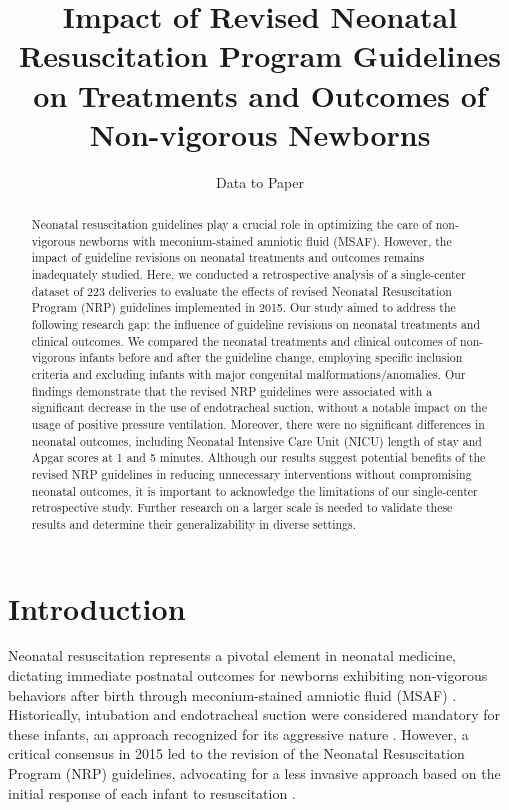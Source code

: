 \documentclass[11pt]{article}
\title{Impact of Revised Neonatal Resuscitation Program Guidelines on Treatments and Outcomes of Non-vigorous Newborns}
\author{Data to Paper}
\begin{document}
\maketitle
\begin{abstract}Neonatal resuscitation guidelines play a crucial role in optimizing the care of non-vigorous newborns with meconium-stained amniotic fluid (MSAF). However, the impact of guideline revisions on neonatal treatments and outcomes remains inadequately studied. Here, we conducted a retrospective analysis of a single-center dataset of 223 deliveries to evaluate the effects of revised Neonatal Resuscitation Program (NRP) guidelines implemented in 2015. Our study aimed to address the following research gap: the influence of guideline revisions on neonatal treatments and clinical outcomes. We compared the neonatal treatments and clinical outcomes of non-vigorous infants before and after the guideline change, employing specific inclusion criteria and excluding infants with major congenital malformations/anomalies. Our findings demonstrate that the revised NRP guidelines were associated with a significant decrease in the use of endotracheal suction, without a notable impact on the usage of positive pressure ventilation. Moreover, there were no significant differences in neonatal outcomes, including Neonatal Intensive Care Unit (NICU) length of stay and Apgar scores at 1 and 5 minutes. Although our results suggest potential benefits of the revised NRP guidelines in reducing unnecessary interventions without compromising neonatal outcomes, it is important to acknowledge the limitations of our single-center retrospective study. Further research on a larger scale is needed to validate these results and determine their generalizability in diverse settings.\end{abstract}
\section*{Introduction}
Neonatal resuscitation represents a pivotal element in neonatal medicine, dictating immediate postnatal outcomes for newborns exhibiting non-vigorous behaviors after birth through meconium-stained amniotic fluid (MSAF) \cite{Mangat2019PharmacologicalAN}. Historically, intubation and endotracheal suction were considered mandatory for these infants, an approach recognized for its aggressive nature \cite{Cutumisu2018GrowthMM}. However, a critical consensus in 2015 led to the revision of the Neonatal Resuscitation Program (NRP) guidelines, advocating for a less invasive approach based on the initial response of each infant to resuscitation \cite{Myers2020ImpactOT, Ades2016UpdateOS}.
\end{document}

